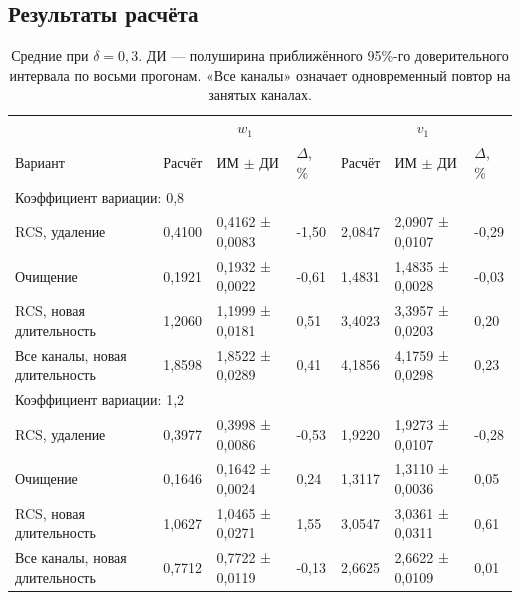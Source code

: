 \subsection{Результаты расчёта}
\begin{table}[!htbp]
\centering\small\setlength{\tabcolsep}{2pt}
\begin{tabular}{@{}p{4.16cm}p{1.61cm}p{2.83cm}p{1.28cm}p{1.61cm}p{2.83cm}p{1.28cm}@{}}
\toprule
 & \multicolumn{3}{c}{$w_1$} & \multicolumn{3}{c}{$v_1$} \\
Вариант & Расчёт & ИМ $\pm$ ДИ & $\Delta$, \% & Расчёт & ИМ $\pm$ ДИ & $\Delta$, \% \\
\midrule
\multicolumn{7}{l}{Коэффициент вариации: 0,8} \\
RCS, удаление & 0,4100 & 0,4162 ± 0,0083 & -1,50 & 2,0847 & 2,0907 ± 0,0107 & -0,29 \\
Очищение & 0,1921 & 0,1932 ± 0,0022 & -0,61 & 1,4831 & 1,4835 ± 0,0028 & -0,03 \\
RCS, новая длительность & 1,2060 & 1,1999 ± 0,0181 & 0,51 & 3,4023 & 3,3957 ± 0,0203 & 0,20 \\
Все каналы, новая длительность & 1,8598 & 1,8522 ± 0,0289 & 0,41 & 4,1856 & 4,1759 ± 0,0298 & 0,23 \\
\multicolumn{7}{l}{Коэффициент вариации: 1,2} \\
RCS, удаление & 0,3977 & 0,3998 ± 0,0086 & -0,53 & 1,9220 & 1,9273 ± 0,0107 & -0,28 \\
Очищение & 0,1646 & 0,1642 ± 0,0024 & 0,24 & 1,3117 & 1,3110 ± 0,0036 & 0,05 \\
RCS, новая длительность & 1,0627 & 1,0465 ± 0,0271 & 1,55 & 3,0547 & 3,0361 ± 0,0311 & 0,61 \\
Все каналы, новая длительность & 0,7712 & 0,7722 ± 0,0119 & -0,13 & 2,6625 & 2,6622 ± 0,0109 & 0,01 \\
\bottomrule
\end{tabular}
\caption{Средние при $\delta=0{,}3$. ДИ --- полуширина приближённого 95\%-го доверительного интервала по восьми прогонам. «Все каналы» означает одновременный повтор на занятых каналах.}
\label{tab:results}
\end{table}

